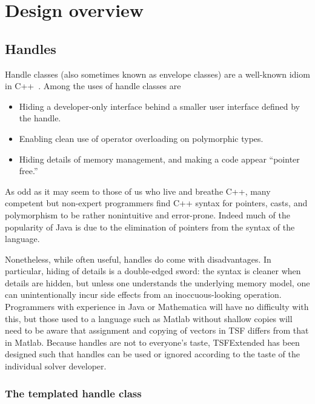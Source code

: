 
\section{Design overview}

\subsection{Handles}

Handle classes
(also sometimes known as envelope classes) 
are a well-known idiom in C++~\cite{ref:advanced_c++_coplien}. 
Among the uses of handle classes are
\begin{itemize}
\item Hiding a developer-only interface behind a smaller user interface
defined by the handle.
\item Enabling clean use of operator overloading on polymorphic types.
\item Hiding details of memory management, and making a code appear
``pointer free.''
\end{itemize}

As odd as it may seem to those of us who live and breathe C++, 
many competent but non-expert
programmers find C++ syntax for pointers, casts, and polymorphism
to be rather nonintuitive and error-prone. Indeed 
much of the popularity of Java is due to the elimination
of pointers from the syntax of the language.  

Nonetheless, while often useful, handles do come with disadvantages. 
In particular, hiding of details is a double-edged sword: the syntax
is cleaner when details are hidden, but unless one understands the 
underlying memory model, one can unintentionally incur side effects
from an inoccuous-looking operation. Programmers with experience in Java
or Mathematica will have no difficulty with this, but those used to a
language such as Matlab without shallow copies will need to be aware that 
assignment and copying of vectors in TSF differs from that in Matlab.
Because handles are not to everyone's taste, TSFExtended has been designed 
such that handles can be used or ignored according to the
taste of the individual solver developer.

\subsubsection{The templated handle class}

